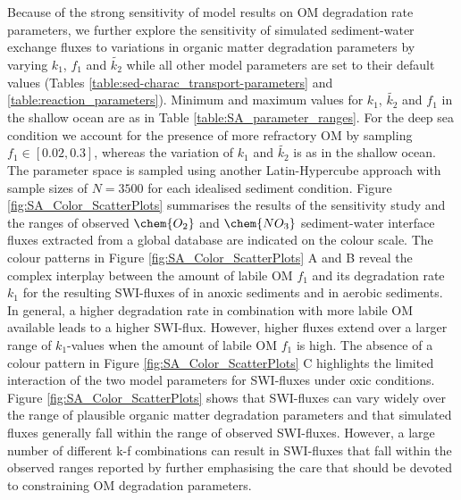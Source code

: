 \documentclass[gmd, manuscript]{copernicus}
\begin{document}
Because of the strong sensitivity of model results on OM degradation rate parameters, we further explore the sensitivity of simulated sediment-water exchange fluxes to variations in organic matter degradation parameters by varying $k_1$, $f_1$ and $\widetilde{k_2}$ while all other model 
parameters are set to their default values (Tables \ref{table:sed-charac_transport-parameters} and \ref{table:reaction_parameters}). Minimum and maximum values for $k_1$, $\widetilde{k_2}$ and $f_1$ in 
the shallow ocean are as in Table \ref{table:SA_parameter_ranges}. 
For the deep sea condition we account for the presence of more refractory OM by sampling $f_1 \in [0.02, 0.3]$, whereas the variation of $k_1$ and $\widetilde{k_2}$ is as in the shallow ocean. 
The parameter space is sampled using another Latin-Hypercube approach with sample sizes of $N=3500$ for each idealised sediment condition. 
Figure \ref{fig:SA_Color_ScatterPlots} summarises the results of the sensitivity study and the ranges of observed $\chem{O_2}$ and $\chem{NO_3}$ sediment-water interface 
fluxes extracted from a global database \citep{stolpovsky_toward_2015} are indicated on the colour scale. The colour patterns in Figure \ref{fig:SA_Color_ScatterPlots} A and B reveal the complex interplay between the amount of labile OM $f_1$ and 
its degradation rate $k_1$ for the resulting SWI-fluxes of  in anoxic sediments and  in aerobic sediments. 
In general, a higher degradation rate in combination with more labile OM available leads to a higher SWI-flux. 
However, higher fluxes extend over a larger range of $k_1$-values when the amount of labile OM $f_1$ is high. 
The absence of a colour pattern in Figure \ref{fig:SA_Color_ScatterPlots} C highlights the limited interaction of the two model parameters for  SWI-fluxes under oxic conditions. 
Figure \ref{fig:SA_Color_ScatterPlots} shows that SWI-fluxes can vary widely over the range of plausible organic matter degradation parameters and that simulated fluxes generally fall within the range of observed SWI-fluxes. 
However, a large number of different k-f combinations can result in SWI-fluxes that fall within the observed ranges reported by \citet{stolpovsky_toward_2015} further emphasising the care that should be devoted to constraining OM degradation parameters. 
\end{document}
